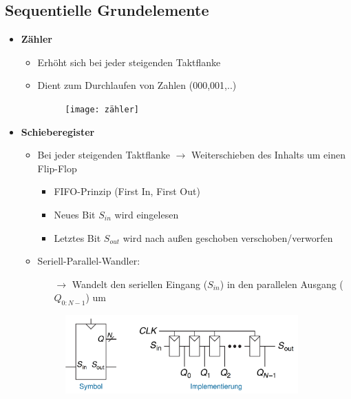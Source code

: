 \documentclass[11pt,a4paper]{article}
\begin{document}
\subsection{Sequentielle Grundelemente}
\begin{itemize}

\item \textbf{Zähler}
	\begin{itemize}
	\item Erhöht sich bei jeder steigenden Taktflanke
	\item Dient zum Durchlaufen von Zahlen (000,001,..)
	\item[]
		\begin{figure}[H]
		\begin{center}
		\texttt{[image: zähler]}
		\end{center}
		\end{figure}
	\end{itemize}
	
\item \textbf{Schieberegister}
	\begin{itemize}
	\item Bei jeder steigenden Taktflanke $\rightarrow$ Weiterschieben des Inhalts um einen Flip-Flop
		\begin{itemize}
		\item FIFO-Prinzip (First In, First Out)
		\item Neues Bit $S_{in}$ wird eingelesen
		\item Letztes Bit $S_{out}$ wird nach außen geschoben verschoben/verworfen
		\end{itemize}
	\item Seriell-Parallel-Wandler: 
		\begin{itemize}
		\item[$\rightarrow$] Wandelt den seriellen Eingang ($S_{in}$) in den parallelen Ausgang ($Q_{0:N-1}$) um
		\end{itemize}
		
	\item[]
		\begin{figure}[H]
		\begin{center}
		\includegraphics[height=3cm]{schieberegister}
		\end{center}
		\end{figure}
	\end{itemize}


\end{itemize}
\end{document}
